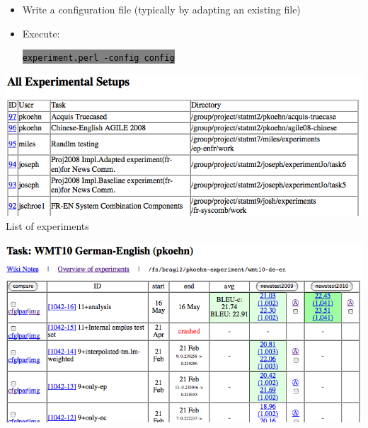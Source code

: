 \documentclass[landscape]{uedslides2C}
\newcommand{\littlecode}[1]{\colorbox{gray}{\textcolor{black}{\small \tt #1}}}
\begin{document}
\vspace{30mm}
\begin{itemize}
\item Write a configuration file
(typically by adapting an existing file)
\vspace{15mm}
\item Execute:
\vspace{-10mm}
\begin{center}
\littlecode{\normalsize experiment.perl -config config}
\end{center}
\end{itemize}


\begin{center}
\includegraphics[scale=1]{web-interface-experiments.png}\\[5mm]
List of experiments
\end{center}


\begin{center}\vspace{-9mm}
\includegraphics[scale=1]{web-interface-runs}
\end{center}
\end{document}
